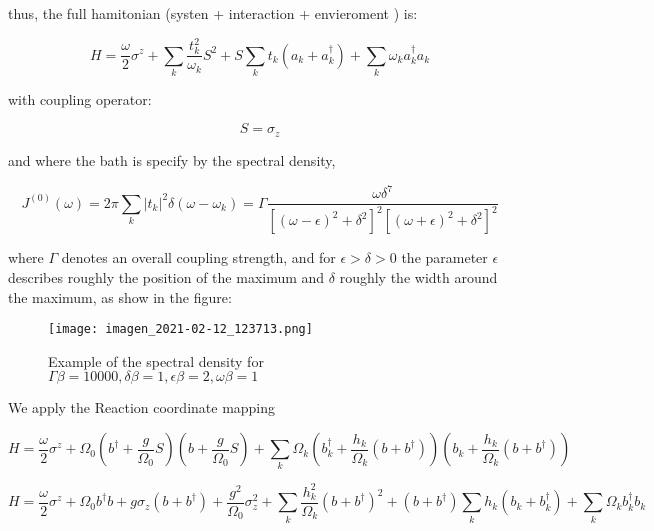 \documentclass[reprint,aps,onecolumn,pra,notitlepage,nofootinbib]{revtex4-1}
\theoremstyle{definition}
\numberwithin{equation}{section}
\begin{document}
 thus, the full hamitonian (systen + interaction + envieroment ) is:



\begin{equation}
H=\frac{\omega}{2} \sigma^{z}+\sum_{k} \frac{t_{k}^{2}}{\omega_{k}} S^{2}+S \sum_{k} t_{k}\left(a_{k}+a_{k}^{\dagger}\right)+\sum_{k} \omega_{k} a_{k}^{\dagger} a_{k}
\end{equation}


with coupling operator:

\begin{equation}
    S=\sigma_z
\end{equation}

and where the bath is specify by the spectral density, 

\begin{equation}
J^{(0)}(\omega)=2 \pi \sum_{k}\left|t_{k}\right|^{2} \delta\left(\omega-\omega_{k}\right)=\Gamma \frac{\omega \delta^{7}}{\left[(\omega-\epsilon)^{2}+\delta^{2}\right]^{2}\left[(\omega+\epsilon)^{2}+\delta^{2}\right]^{2}}
\end{equation}

where $\Gamma$ denotes an overall coupling strength, and for $\epsilon>\delta>0$ the parameter $\epsilon$ describes roughly the position of the maximum and $\delta$ roughly the width around the maximum, as show in the figure: 

\begin{figure}[h]
\texttt{[image: imagen\_2021-02-12\_123713.png]}
\caption{Example of the spectral density for $\Gamma \beta=10000, \delta \beta=1, \epsilon \beta=2, \omega \beta=1$}
\end{figure}


We apply the Reaction coordinate mapping


\begin{equation}
H=\frac{\omega}{2} \sigma^{z}+\Omega_{0}\left(b^{\dagger}+\frac{g}{\Omega_{0}} S\right)\left(b+\frac{g}{\Omega_{0}} S\right)+\sum_{k} \Omega_{k}\left(b_{k}^{\dagger}+\frac{h_{k}}{\Omega_{k}}\left(b+b^{\dagger}\right)\right)\left(b_{k}+\frac{h_{k}}{\Omega_{k}}\left(b+b^{\dagger}\right)\right)
\end{equation}

\begin{equation}
    H=\frac{\omega}{2} \sigma^{z} +\Omega_0 b ^{\dagger} b  + g \sigma_z \left( b + b ^{\dagger} \right) + \frac{g^2}{\Omega_0} \sigma_z^2 + \sum_k \frac{h_k^2}{\Omega_k} \left( b + b ^{\dagger} \right)^2 + \left( b + b ^{\dagger} \right) \sum_k h_k \left( b_k + b_k ^{\dagger} \right) + \sum_{k} \Omega_k b_k ^{\dagger} b_k
\end{equation}
\end{document}
